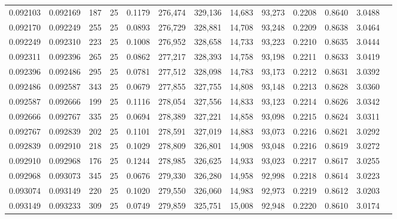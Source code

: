 \begin{tabular}{rrrrrrrrrrrrr}
0.092103 & 0.092169 &   187 &  25 &                                     0.1179 & 276,474 & 329,136 &  14,683 &  93,273 & 0.2208 & 0.8640 & 3.0488 \\
0.092170 & 0.092249 &   255 &  25 &                                     0.0893 & 276,729 & 328,881 &  14,708 &  93,248 & 0.2209 & 0.8638 & 3.0464 \\
0.092249 & 0.092310 &   223 &  25 &                                     0.1008 & 276,952 & 328,658 &  14,733 &  93,223 & 0.2210 & 0.8635 & 3.0444 \\
0.092311 & 0.092396 &   265 &  25 &                                     0.0862 & 277,217 & 328,393 &  14,758 &  93,198 & 0.2211 & 0.8633 & 3.0419 \\
0.092396 & 0.092486 &   295 &  25 &                                     0.0781 & 277,512 & 328,098 &  14,783 &  93,173 & 0.2212 & 0.8631 & 3.0392 \\
0.092486 & 0.092587 &   343 &  25 &                                     0.0679 & 277,855 & 327,755 &  14,808 &  93,148 & 0.2213 & 0.8628 & 3.0360 \\
0.092587 & 0.092666 &   199 &  25 &                                     0.1116 & 278,054 & 327,556 &  14,833 &  93,123 & 0.2214 & 0.8626 & 3.0342 \\
0.092666 & 0.092767 &   335 &  25 &                                     0.0694 & 278,389 & 327,221 &  14,858 &  93,098 & 0.2215 & 0.8624 & 3.0311 \\
0.092767 & 0.092839 &   202 &  25 &                                     0.1101 & 278,591 & 327,019 &  14,883 &  93,073 & 0.2216 & 0.8621 & 3.0292 \\
0.092839 & 0.092910 &   218 &  25 &                                     0.1029 & 278,809 & 326,801 &  14,908 &  93,048 & 0.2216 & 0.8619 & 3.0272 \\
0.092910 & 0.092968 &   176 &  25 &                                     0.1244 & 278,985 & 326,625 &  14,933 &  93,023 & 0.2217 & 0.8617 & 3.0255 \\
0.092968 & 0.093073 &   345 &  25 &                                     0.0676 & 279,330 & 326,280 &  14,958 &  92,998 & 0.2218 & 0.8614 & 3.0223 \\
0.093074 & 0.093149 &   220 &  25 &                                     0.1020 & 279,550 & 326,060 &  14,983 &  92,973 & 0.2219 & 0.8612 & 3.0203 \\
0.093149 & 0.093233 &   309 &  25 &                                     0.0749 & 279,859 & 325,751 &  15,008 &  92,948 & 0.2220 & 0.8610 & 3.0174 \\

\end{tabular}
